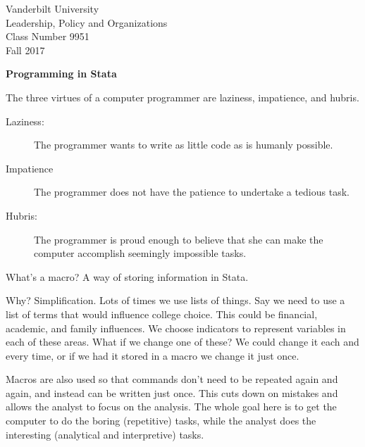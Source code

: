 \documentclass[10pt]{article}
\begin{document}
\thispagestyle{empty}%


\setmarginsrb{1in}{.5in}{.1in}{.5in}{0pt}{0mm}{0pt}{0mm}%

\setlength{\parskip}{1ex plus 0.5ex minus 0.2ex}

\setcounter{secnumdepth}{-2}



\begin{flushleft}
Vanderbilt University\\Leadership, Policy and Organizations\\Class Number 9951\\ Fall 2017\\
\end{flushleft}



\begin{center}
  \textbf{Programming in Stata}
\end{center}

The three virtues of a computer programmer are laziness, impatience, and hubris. 

\begin{description}
\item[Laziness:] The programmer wants to write as little code as is humanly possible.

\item[Impatience] The programmer does not have the patience to undertake a tedious task.

\item[Hubris:] The programmer is proud enough to believe that she can
  make the computer accomplish seemingly impossible tasks. 

\end{description}

What's a macro? A way of storing information in Stata. 

Why? Simplification. Lots of times we use lists of things. Say we need
to use a list of terms that would influence college choice. This could
be financial, academic, and family influences. We choose indicators to
represent variables in each of these areas. What if we change one of
these? We could change it each and every time, or if we had it stored
in a macro we change it just once. 

Macros are also used so that commands don't need to be repeated again
and again, and instead can be written just once. This cuts down on
mistakes and allows the analyst to focus on the analysis. The whole
goal here is to get the computer to do the boring (repetitive) tasks,
while the analyst does the interesting (analytical and interpretive)
tasks. 
\end{document}
